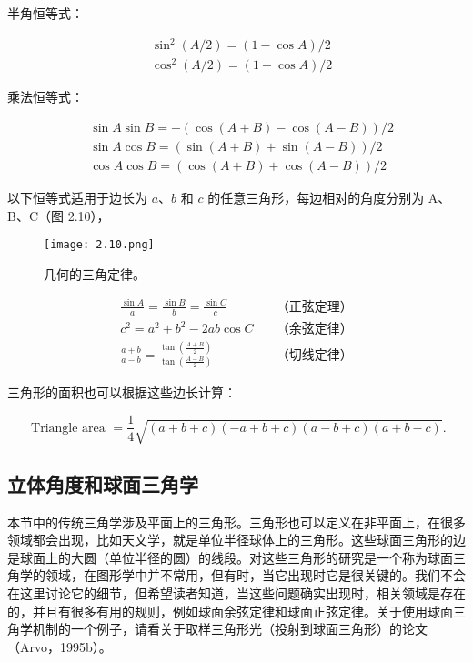 \documentclass[lang=cn,12pt]{elegantbook}
\begin{document}
半角恒等式：

$$
\begin{aligned}
&\sin ^{2}(A / 2)=(1-\cos A) / 2 \\
&\cos ^{2}(A / 2)=(1+\cos A) / 2
\end{aligned}
$$

乘法恒等式：

$$
\begin{aligned}
&\sin A \sin B=-(\cos (A+B)-\cos (A-B)) / 2 \\
&\sin A \cos B=(\sin (A+B)+\sin (A-B)) / 2 \\
&\cos A \cos B=(\cos (A+B)+\cos (A-B)) / 2
\end{aligned}
$$

以下恒等式适用于边长为 $a$、$b$ 和 $c$ 的任意三角形，每边相对的角度分别为 A、B、C（图 2.10），

\begin{figure}[htbp]
\centering
\texttt{[image: 2.10.png]}
\caption{几何的三角定律。}
\end{figure}

$$
\begin{aligned}
\frac{\sin A}{a}=\frac{\sin B}{b}=\frac{\sin C}{c}\quad &\mbox{（正弦定理）}\\
c^{2}=a^{2}+b^{2}-2 a b \cos C\quad &\mbox{（余弦定律）}\\
\frac{a+b}{a-b}=\frac{\tan \left(\frac{A+B}{2}\right)}{\tan \left(\frac{A-B}{2}\right)}\quad &\mbox{（切线定律）}
\end{aligned}
$$

三角形的面积也可以根据这些边长计算：

$$
\text { Triangle area }=\frac{1}{4} \sqrt{(a+b+c)(-a+b+c)(a-b+c)(a+b-c)} .
$$

\subsection{立体角度和球面三角学}

本节中的传统三角学涉及平面上的三角形。三角形也可以定义在非平面上，在很多领域都会出现，比如天文学，就是单位半径球体上的三角形。这些球面三角形的边是球面上的大圆（单位半径的圆）的线段。对这些三角形的研究是一个称为球面三角学的领域，在图形学中并不常用，但有时，当它出现时它是很关键的。我们不会在这里讨论它的细节，但希望读者知道，当这些问题确实出现时，相关领域是存在的，并且有很多有用的规则，例如球面余弦定律和球面正弦定律。关于使用球面三角学机制的一个例子，请看关于取样三角形光（投射到球面三角形）的论文（Arvo，1995b）。
\end{document}
